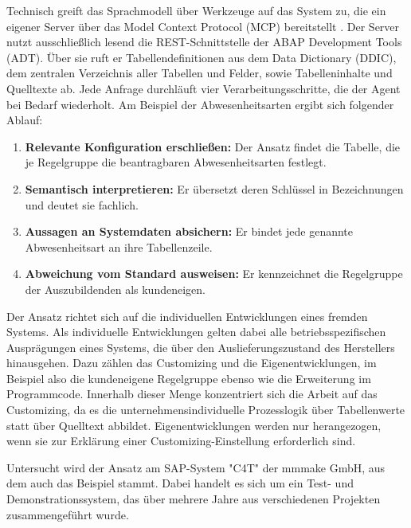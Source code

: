 Technisch greift das Sprachmodell über Werkzeuge auf das System zu, die ein eigener Server über das Model Context Protocol (MCP) bereitstellt \cite{noauthor_introducing_nodate}. Der Server nutzt ausschließlich lesend die REST-Schnittstelle der ABAP Development Tools (ADT). Über sie ruft er Tabellendefinitionen aus dem Data Dictionary (DDIC), dem zentralen Verzeichnis aller Tabellen und Felder, sowie Tabelleninhalte und Quelltexte ab. Jede Anfrage durchläuft vier Verarbeitungsschritte, die der Agent bei Bedarf wiederholt. Am Beispiel der Abwesenheitsarten ergibt sich folgender Ablauf:
\begin{enumerate}
	\item \textbf{Relevante Konfiguration erschließen:} Der Ansatz findet die Tabelle, die je Regelgruppe die beantragbaren Abwesenheitsarten festlegt.
	\item \textbf{Semantisch interpretieren:} Er übersetzt deren Schlüssel in Bezeichnungen und deutet sie fachlich.
	\item \textbf{Aussagen an Systemdaten absichern:} Er bindet jede genannte Abwesenheitsart an ihre Tabellenzeile.
	\item \textbf{Abweichung vom Standard ausweisen:} Er kennzeichnet die Regelgruppe der Auszubildenden als kundeneigen.
\end{enumerate}
 
Der Ansatz richtet sich auf die individuellen Entwicklungen eines fremden Systems. Als individuelle Entwicklungen gelten dabei alle betriebsspezifischen Ausprägungen eines Systems, die über den Auslieferungszustand des Herstellers hinausgehen. Dazu zählen das Customizing und die Eigenentwicklungen, im Beispiel also die kundeneigene Regelgruppe ebenso wie die Erweiterung im Programmcode. Innerhalb dieser Menge konzentriert sich die Arbeit auf das Customizing, da es die unternehmensindividuelle Prozesslogik über Tabellenwerte statt über Quelltext abbildet. Eigenentwicklungen werden nur herangezogen, wenn sie zur Erklärung einer Customizing-Einstellung erforderlich sind.

Untersucht wird der Ansatz am SAP-System "C4T" der mmmake GmbH, aus dem auch das Beispiel stammt. Dabei handelt es sich um ein Test- und Demonstrationssystem, das über mehrere Jahre aus verschiedenen Projekten zusammengeführt wurde.






